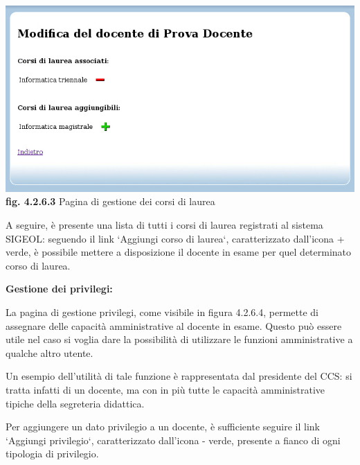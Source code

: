 \documentclass[11pt,a4paper]{article}
\begin{document}
\bigskip
\begin{center}
	\includegraphics[scale=0.5]{images/gestione_corsi.jpg}\\
	\textbf{fig. 4.2.6.3} Pagina di gestione dei corsi di laurea\\
\end{center}
\bigskip

A seguire, è presente una lista di tutti i corsi di laurea registrati al sistema SIGEOL: seguendo il link `Aggiungi corso di laurea`, caratterizzato dall'icona + verde, è possibile mettere a disposizione il docente in esame per quel determinato corso di laurea.
\newline \newline
\begin{large}\textbf{Gestione dei privilegi:}\end{large}
\newline \newline
La pagina di gestione privilegi, come visibile in figura 4.2.6.4, permette di assegnare delle capacità amministrative al docente in esame. Questo può essere utile nel caso si voglia dare la possibilità di utilizzare le funzioni amministrative a qualche altro utente.

Un esempio dell'utilità di tale funzione è rappresentata dal presidente del CCS: si tratta infatti di un docente, ma con in più tutte le capacità amministrative tipiche della segreteria didattica.

Per aggiungere un dato privilegio a un docente, è sufficiente seguire il link `Aggiungi privilegio`, caratterizzato dall'icona - verde, presente a fianco di ogni tipologia di privilegio.
\end{document}
